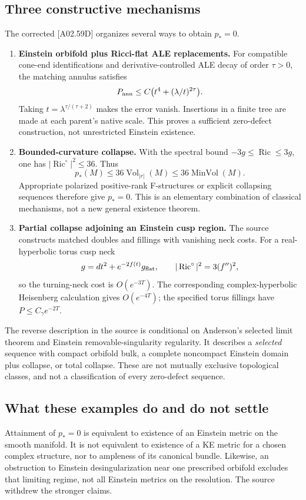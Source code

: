 \documentclass[11pt]{article}
\newcommand{\Ric}{\operatorname{Ric}}
\newcommand{\Vol}{\operatorname{Vol}}
\newcommand{\sref}[1]{\textsf{[#1]}}
\theoremstyle{remark}
\begin{document}
\subsection{Three constructive mechanisms}
The corrected \sref{A02.59D} organizes several ways to obtain $p_*=0$.
\begin{enumerate}
\item \textbf{Einstein orbifold plus Ricci-flat ALE replacements.}
For compatible cone-end identifications and derivative-controlled ALE decay
of order $\tau>0$, the matching annulus satisfies
\[
 P_{\rm ann}\le C\bigl(t^4+(\lambda/t)^{2\tau}\bigr).
\]
Taking $t=\lambda^{\tau/(\tau+2)}$ makes the error vanish. Insertions in a
finite tree are made at each parent's native scale. This proves a
sufficient zero-defect construction, not unrestricted Einstein existence.
\item \textbf{Bounded-curvature collapse.} With the spectral bound
$-3g\le\Ric\le3g$, one has $|\Ric^\circ|^2\le36$. Thus
\[
 p_*(M)\le36\Vol_{|r|}(M)\le36\operatorname{MinVol}(M).
\]
Appropriate polarized positive-rank F-structures or explicit collapsing
sequences therefore give $p_*=0$. This is an elementary combination of
classical mechanisms, not a new general existence theorem.
\item \textbf{Partial collapse adjoining an Einstein cusp region.}
The source constructs matched doubles and fillings with vanishing neck
costs. For a real-hyperbolic torus cusp neck
\[
 g=dt^2+e^{-2f(t)}g_{\rm flat},\qquad
 |\Ric^\circ|^2=3(f'')^2,
\]
so the turning-neck cost is $O(e^{-3T})$. The corresponding
complex-hyperbolic Heisenberg calculation gives $O(e^{-4T})$; the specified
torus fillings have $P\le C_\gamma e^{-2T}$.
\end{enumerate}

The reverse description in the source is conditional on Anderson's selected
limit theorem and Einstein removable-singularity regularity. It describes a
\emph{selected} sequence with compact orbifold bulk, a complete noncompact
Einstein domain plus collapse, or total collapse. These are not mutually
exclusive topological classes, and not a classification of every zero-defect
sequence.

\subsection{What these examples do and do not settle}
Attainment of $p_*=0$ is equivalent to existence of an Einstein metric on
the smooth manifold. It is not equivalent to existence of a KE metric for a
chosen complex structure, nor to ampleness of its canonical bundle.
Likewise, an obstruction to Einstein desingularization near one prescribed
orbifold excludes that limiting regime, not all Einstein metrics on the
resolution. The source withdrew the stronger claims.
\end{document}
